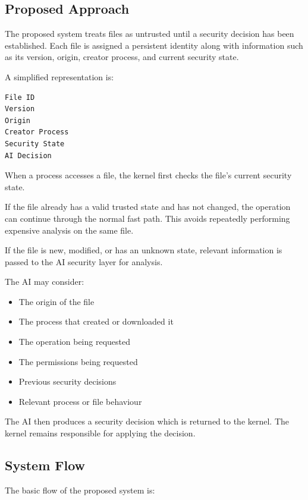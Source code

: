 \subsection{Proposed Approach}

The proposed system treats files as untrusted until a security decision has been established. Each file is assigned a persistent identity along with information such as its version, origin, creator process, and current security state.

A simplified representation is:

\begin{verbatim}
File ID
Version
Origin
Creator Process
Security State
AI Decision
\end{verbatim}

When a process accesses a file, the kernel first checks the file's current security state.

If the file already has a valid trusted state and has not changed, the operation can continue through the normal fast path. This avoids repeatedly performing expensive analysis on the same file.

If the file is new, modified, or has an unknown state, relevant information is passed to the AI security layer for analysis.

The AI may consider:

\begin{itemize}
    \item The origin of the file
    \item The process that created or downloaded it
    \item The operation being requested
    \item The permissions being requested
    \item Previous security decisions
    \item Relevant process or file behaviour
\end{itemize}

The AI then produces a security decision which is returned to the kernel. The kernel remains responsible for applying the decision.

\subsection{System Flow}

The basic flow of the proposed system is:

